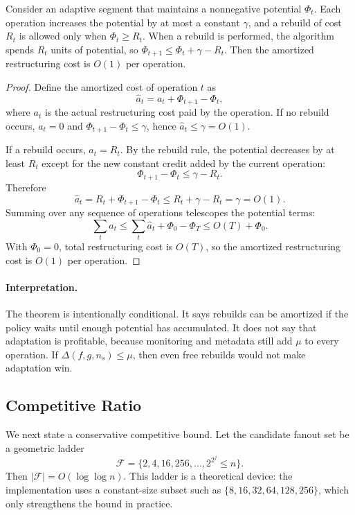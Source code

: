 \begin{theorem}
\label{thm:potential}
Consider an adaptive segment that maintains a nonnegative potential $\Phi_t$.
Each operation increases the potential by at most a constant $\gamma$, and a
rebuild of cost $R_t$ is allowed only when $\Phi_t \ge R_t$.  When a rebuild is
performed, the algorithm spends $R_t$ units of potential, so
$\Phi_{t+1}\le \Phi_t + \gamma - R_t$.  Then the amortized restructuring cost
is $O(1)$ per operation.
\end{theorem}

\begin{proof}
Define the amortized cost of operation $t$ as
\[
  \hat{a}_t = a_t + \Phi_{t+1}-\Phi_t,
\]
where $a_t$ is the actual restructuring cost paid by the operation.  If no
rebuild occurs, $a_t=0$ and $\Phi_{t+1}-\Phi_t\le \gamma$, hence
$\hat{a}_t\le \gamma=O(1)$.

If a rebuild occurs, $a_t=R_t$.  By the rebuild rule, the potential decreases
by at least $R_t$ except for the new constant credit added by the current
operation:
\[
  \Phi_{t+1}-\Phi_t \le \gamma - R_t .
\]
Therefore
\[
  \hat{a}_t = R_t + \Phi_{t+1}-\Phi_t
  \le R_t + \gamma - R_t
  = \gamma = O(1).
\]
Summing over any sequence of operations telescopes the potential terms:
\[
  \sum_t a_t \le \sum_t \hat{a}_t + \Phi_0-\Phi_T
  \le O(T) + \Phi_0.
\]
With $\Phi_0=0$, total restructuring cost is $O(T)$, so the amortized
restructuring cost is $O(1)$ per operation.
\end{proof}

\paragraph{Interpretation.}
The theorem is intentionally conditional.  It says rebuilds can be amortized
if the policy waits until enough potential has accumulated.  It does not say
that adaptation is profitable, because monitoring and metadata still add
$\mu$ to every operation.  If $\Delta(f,g,n_s)\le\mu$, then even free rebuilds
would not make adaptation win.

\subsection{Competitive Ratio}

We next state a conservative competitive bound.  Let the candidate fanout set
be a geometric ladder
\[
  \mathcal{F}=\{2,4,16,256,\ldots,2^{2^j}\le n\}.
\]
Then $|\mathcal{F}|=O(\log\log n)$.  This ladder is a theoretical device:
the implementation uses a constant-size subset such as
$\{8,16,32,64,128,256\}$, which only strengthens the bound in practice.

